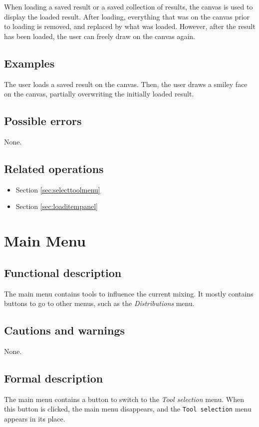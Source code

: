   When loading a saved result or a saved collection of results, the canvas is used to display the loaded result. After loading, everything that was on the canvas prior to loading is removed, and replaced by what was loaded. However, after the result has been loaded, the user can freely draw on the canvas again.

  \subsection*{Examples}
  The user loads a saved result on the canvas. Then, the user draws a smiley face on the canvas, partially overwriting the initially loaded result.

  \subsection*{Possible errors}
  None.

  \subsection*{Related operations}
  \begin{itemize}
    \item Section \ref{sec:selecttoolmenu}
    \item Section \ref{sec:loaditempanel}
  \end{itemize}  

\section{Main Menu}\label{sec:mainmenu}
  \subsection*{Functional description}
  The main menu contains tools to influence the current mixing. It mostly contains buttons to go to other menus, such as the \emph{Distributions} menu.

  \subsection*{Cautions and warnings}
  None.

  \subsection*{Formal description}
  The main menu contains a button to switch to the \emph{Tool selection} menu. When this button is clicked, the main menu disappears, and the \texttt{Tool selection} menu appears in its place.
  
